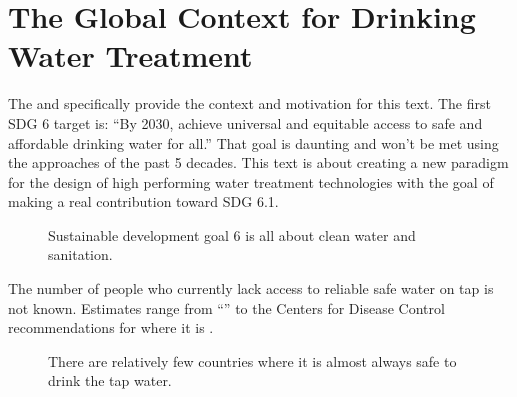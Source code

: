 \documentclass[letterpaper,10pt,english]{sphinxmanual}
\let\sphinxpxdimen\pdfpxdimen\else\newdimen\sphinxpxdimen
\begin{document}
\section{The Global Context for Drinking Water Treatment}
\label{\detokenize{Introduction/Introduction:the-global-context-for-drinking-water-treatment}}\label{\detokenize{Introduction/Introduction:heading-the-global-context-for-drinking-water-treatment}}
The  and specifically  provide the context and motivation for this text. The first SDG 6 target is: “By 2030, achieve universal and equitable access to safe and affordable drinking water for all.” That goal is daunting and won’t be met using the approaches of the past 5 decades. This text is about creating a new paradigm for the design of high performing water treatment technologies with the goal of making a real contribution toward SDG 6.1.

\begin{figure}[htbp]
\centering
\capstart

\noindent\sphinxincludegraphics[width=100\sphinxpxdimen]{{SDG6}.png}
\caption{Sustainable development goal 6 is all about clean water and sanitation.}\label{\detokenize{Introduction/Introduction:id14}}\label{\detokenize{Introduction/Introduction:figure-sdg6}}\end{figure}

The number of people who currently lack access to reliable safe water on tap is not known. Estimates range from “” to the Centers for Disease Control recommendations for where it is .

\begin{figure}[htbp]
\centering
\capstart

\noindent\sphinxincludegraphics[width=600\sphinxpxdimen]{{CDC_Global_Safe_Tap_Water}.png}
\caption{There are relatively few countries where it is almost always safe to drink the tap water.}\label{\detokenize{Introduction/Introduction:id15}}\label{\detokenize{Introduction/Introduction:figure-cdc-global-safe-tap-water}}\end{figure}
\end{document}
